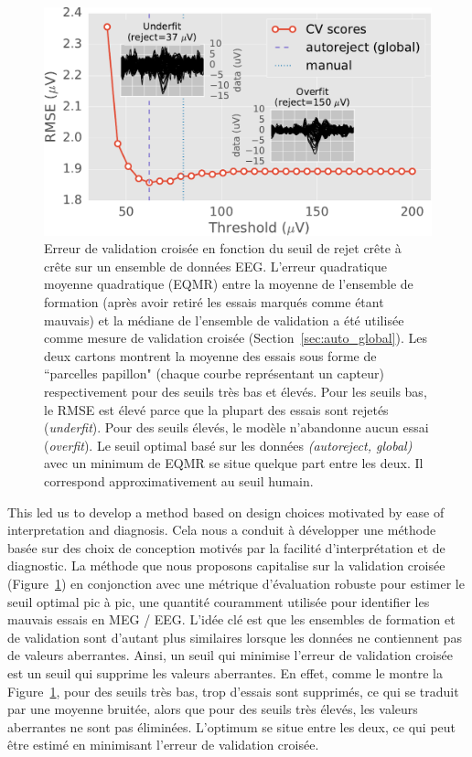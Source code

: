 \begin{figure}[htb]
	\centering
	\includegraphics[width=0.8\linewidth]{figures/figure1.pdf}
    \caption[]{Erreur de validation croisée en fonction du seuil de rejet crête à crête sur un ensemble de données EEG. L'erreur quadratique moyenne quadratique (EQMR) entre la moyenne de l'ensemble de formation (après avoir retiré les essais marqués comme étant mauvais) et la médiane de l'ensemble de validation a été utilisée comme mesure de validation croisée (Section~\ref{sec:auto_global}). Les deux cartons montrent la moyenne des essais sous forme de ``parcelles papillon" (chaque courbe représentant un capteur) respectivement pour des seuils très bas et élevés. Pour les seuils bas, le RMSE est élevé parce que la plupart des essais sont rejetés (\emph{underfit}). Pour des seuils élevés, le modèle n'abandonne aucun essai (\emph{overfit}). Le seuil optimal basé sur les données \emph{(autoreject, global)} avec un minimum de EQMR se situe quelque part entre les deux. Il correspond approximativement au seuil humain.}
    \label{fig:sommaire:cross_val}
\end{figure}

This led us to develop a method based on design choices motivated by ease of interpretation and diagnosis. 
Cela nous a conduit à développer une méthode basée sur des choix de conception motivés par la facilité d’interprétation et de diagnostic. La méthode que nous proposons capitalise sur la validation croisée (Figure~\ref{fig:sommaire:cross_val}) en conjonction avec une métrique d'évaluation robuste pour estimer le seuil optimal pic à pic, une quantité couramment utilisée pour identifier les mauvais essais en MEG / EEG. L'idée clé est que les ensembles de formation et de validation sont d’autant plus similaires lorsque les données ne contiennent pas de valeurs aberrantes. Ainsi, un seuil qui minimise l'erreur de validation croisée est un seuil qui supprime les valeurs aberrantes. En effet, comme le montre la Figure~\ref{fig:sommaire:cross_val}, pour des seuils très bas, trop d'essais sont supprimés, ce qui se traduit par une moyenne bruitée, alors que pour des seuils très élevés, les valeurs aberrantes ne sont pas éliminées. L’optimum se situe entre les deux, ce qui peut être estimé en minimisant l’erreur de validation croisée.

